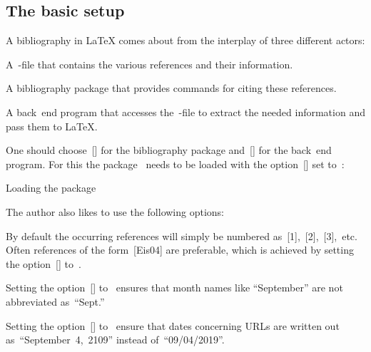 \subsection{The basic setup}

A bibliography in {\LaTeX} comes about from the interplay of three different actors:
\begin{myitemize}
  \item
    A~-file that contains the various references and their information.
  \item
    A bibliography package that provides commands for citing these references.
  \item
    A back~end program that accesses the~-file to extract the needed information and pass them to {\LaTeX}.
\end{myitemize}
One should choose~[\packname] for the bibliography package and~[\appname] for the back~end program.
For this the package~ needs to be loaded with the option~[\optname] set to~:
\begin{showcode}{Loading the package~}
\usepackage[backend = biber]{biblatex}
\end{showcode}
The author also likes to use the following options:
\begin{myitemize}
  \item
    By default the occurring references will simply be numbered as~[1],~[2],~[3],~etc\@.
    Often references of the form~[Eis04] are preferable, which is achieved by setting the option~[\optname] to~.
  \item
    Setting the option~[\optname] to~ ensures that month names like \enquote{September} are not abbreviated as~\enquote{Sept.}
  \item
    Setting the option~[\optname] to~ ensure that dates concerning URLs are written out as~\enquote{September~4,~2109} instead of~\enquote{09/04/2019}.
\end{myitemize}



